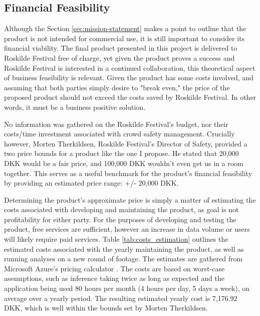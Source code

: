 \subsection{Financial Feasibility}

Although the Section \ref{sec:mission-statement} makes a point to outline that the product is not intended for commercial use, it is still important to consider its financial viability. The final product presented in this project is delivered to Roskilde Festival free of charge, yet given the product proves a success and Roskilde Festival is interested in a continued collaboration, this theoretical aspect of business feasibility is relevant. Given the product has some costs involved, and assuming that both parties simply desire to "break even," the price of the proposed product should not exceed the costs saved by Roskilde Festival. In other words, it must be a business positive solution.

No information was gathered on the Roskilde Festival's budget, nor their costs/time investment associated with crowd safety management. Crucially however, Morten Therkildsen, Roskilde Festival's Director of Safety, provided a two price bounds for a product like the one I propose. He stated that 20,000 DKK would be a fair price, and 100,000 DKK wouldn't even get us in a room together. This serves as a useful benchmark for the product's financial feasibility by providing an estimated price range: +/- 20,000 DKK.

Determining the product's approximate price is simply a matter of estimating the costs associated with developing and maintaining the product, as goal is not profitability for either party. For the purposes of developing and testing the product, free services are sufficient, however an increase in data volume or users will likely require paid services. Table \ref{tab:costs_estimation} outlines the estimated costs associated with the yearly maintaining the product, as well as running analyses on a new round of footage. The estimates are gathered from Microsoft Azure's pricing calculator \cite{azure_pricing}. The costs are based on worst-case assumptions, such as inference taking twice as long as expected and the application being used 80 hours per month (4 hours per day, 5 days a week), on average over a yearly period. The resulting estimated yearly cost is 7,176.92 DKK, which is well within the bounds set by Morten Therkildsen.


